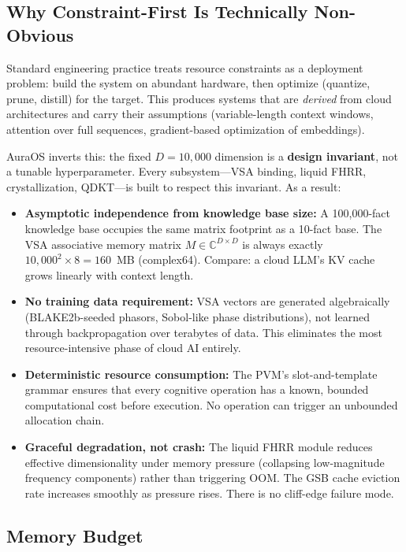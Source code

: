 \documentclass[11pt]{article}
\begin{document}
\subsection{Why Constraint-First Is Technically Non-Obvious}

Standard engineering practice treats resource constraints as a deployment problem: build the system on abundant hardware, then optimize (quantize, prune, distill) for the target. This produces systems that are \textit{derived} from cloud architectures and carry their assumptions (variable-length context windows, attention over full sequences, gradient-based optimization of embeddings).

AuraOS inverts this: the fixed $D = 10{,}000$ dimension is a \textbf{design invariant}, not a tunable hyperparameter. Every subsystem—VSA binding, liquid FHRR, crystallization, QDKT—is built to respect this invariant. As a result:

\begin{itemize}
    \item \textbf{Asymptotic independence from knowledge base size:} A 100,000-fact knowledge base occupies the same matrix footprint as a 10-fact base. The VSA associative memory matrix $M \in \mathbb{C}^{D \times D}$ is always exactly $10{,}000^2 \times 8 = 160$~MB (complex64). Compare: a cloud LLM's KV cache grows linearly with context length.
    \item \textbf{No training data requirement:} VSA vectors are generated algebraically (BLAKE2b-seeded phasors, Sobol-like phase distributions), not learned through backpropagation over terabytes of data. This eliminates the most resource-intensive phase of cloud AI entirely.
    \item \textbf{Deterministic resource consumption:} The PVM's slot-and-template grammar ensures that every cognitive operation has a known, bounded computational cost before execution. No operation can trigger an unbounded allocation chain.
    \item \textbf{Graceful degradation, not crash:} The liquid FHRR module reduces effective dimensionality under memory pressure (collapsing low-magnitude frequency components) rather than triggering OOM. The GSB cache eviction rate increases smoothly as pressure rises. There is no cliff-edge failure mode.
\end{itemize}

\subsection{Memory Budget}
\end{document}

